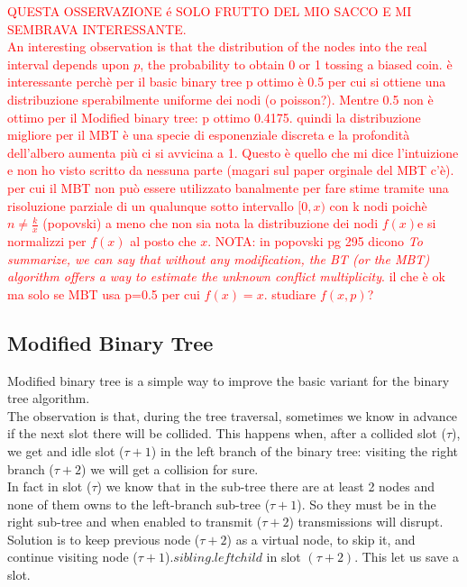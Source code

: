\documentclass[12pt,a4paper,twocolumns]{report}
\begin{document}
\textcolor{red}{QUESTA OSSERVAZIONE é SOLO FRUTTO DEL MIO SACCO E MI SEMBRAVA INTERESSANTE.\\
An interesting observation is that the distribution of the nodes into the real interval depends upon $p$, the probability  to obtain 0 or 1 tossing a biased coin.
è interessante perchè per il basic binary tree p ottimo è 0.5 per cui si ottiene una distribuzione sperabilmente uniforme dei nodi (o poisson?). Mentre 0.5 non è ottimo per il Modified binary tree: p ottimo 0.4175. quindi la distribuzione migliore per il MBT è una specie di esponenziale discreta e la profondità dell'albero aumenta più ci si avvicina a 1. Questo è quello che mi dice l'intuizione e non ho visto scritto da nessuna parte (magari sul paper orginale del MBT c'è). per cui il MBT non può essere utilizzato banalmente per fare stime tramite una risoluzione parziale di un qualunque sotto intervallo $[0,x)$ con k nodi poichè $n \neq \frac{k}{x} $ (popovski) a meno che non sia nota la distribuzione dei nodi $f(x) $e si normalizzi per $f(x)$ al posto che $x$. 
NOTA: in popovski pg 295  dicono \emph{To summarize, we can say that without any modification, the BT (or the MBT) algorithm offers a way to estimate the unknown conflict multiplicity}. il che è ok ma solo se MBT usa p=0.5
per cui $f(x)=x$. studiare $f(x,p)$?}
\subsection{Modified Binary Tree}

Modified binary tree is a simple way to improve the basic variant for the binary tree algorithm.\\ The observation is that, during the tree traversal, sometimes we know in advance if the next slot there will be collided. This happens when, after a collided slot ($\tau$), we get and idle slot ($\tau+1$) in the left branch of the binary tree: visiting the right branch ($\tau+2$) we will get a collision for sure.\\
In fact in slot ($\tau$) we know that in the sub-tree there are at least 2 nodes and none of them owns to the left-branch sub-tree ($\tau+1$). So they must be in the right sub-tree and when enabled to transmit ($\tau+2$) transmissions will disrupt.
Solution is to keep previous node ($\tau+2$) as a virtual node, to skip it, and continue visiting node ($\tau+1$).$sibling$.$leftchild$ in slot $(\tau+2)$.
This let us save a slot.\\
\end{document}
